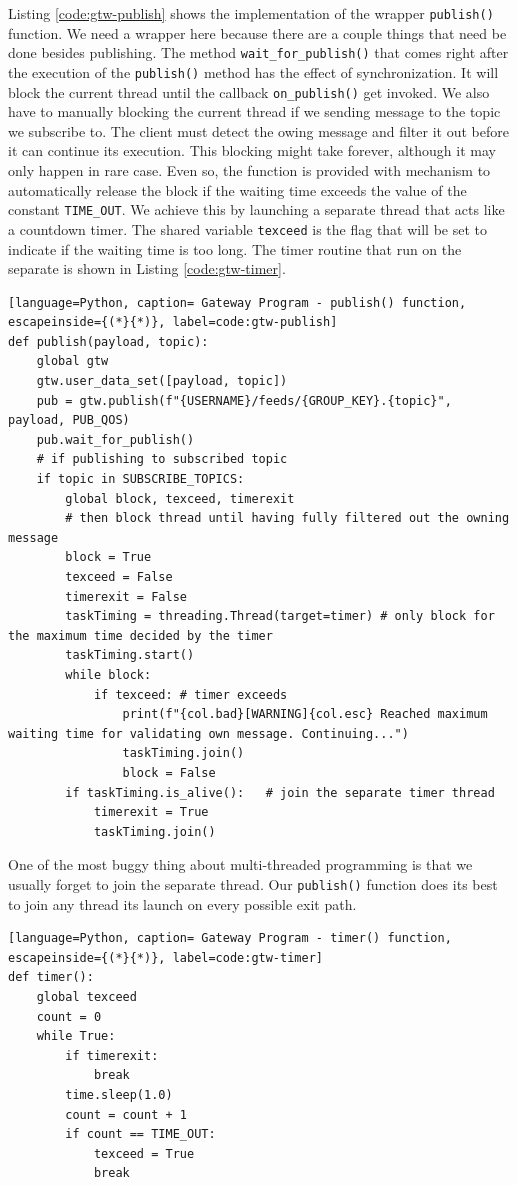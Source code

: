 Listing \ref{code:gtw-publish} shows the implementation of the wrapper \texttt{publish()} function. We need a wrapper here because there are a couple things that need be done besides publishing. The method \texttt{wait\_for\_publish()} that comes right after the execution of the \texttt{publish()} method has the effect of synchronization. It will block the current thread until the callback \texttt{on\_publish()} get invoked. We also have to manually blocking the current thread if we sending message to the topic we subscribe to. The client must detect the owing message and filter it out before it can continue its execution. This blocking might take forever, although it may only happen in rare case. Even so, the function is provided with mechanism to automatically release the block if the waiting time exceeds the value of the constant \texttt{TIME\_OUT}. We achieve this by launching a separate thread that acts like a countdown timer. The shared variable \texttt{texceed} is the flag that will be set to indicate if the waiting time is too long. The timer routine that run on the separate is shown in Listing \ref{code:gtw-timer}.
\begin{lstlisting}[language=Python, caption= Gateway Program - publish() function, escapeinside={(*}{*)}, label=code:gtw-publish]
def publish(payload, topic):
    global gtw
    gtw.user_data_set([payload, topic])
    pub = gtw.publish(f"{USERNAME}/feeds/{GROUP_KEY}.{topic}", payload, PUB_QOS)
    pub.wait_for_publish()
    # if publishing to subscribed topic
    if topic in SUBSCRIBE_TOPICS:
        global block, texceed, timerexit
        # then block thread until having fully filtered out the owning message
        block = True
        texceed = False
        timerexit = False
        taskTiming = threading.Thread(target=timer) # only block for the maximum time decided by the timer
        taskTiming.start()
        while block:
            if texceed: # timer exceeds
                print(f"{col.bad}[WARNING]{col.esc} Reached maximum waiting time for validating own message. Continuing...")
                taskTiming.join()
                block = False
        if taskTiming.is_alive():   # join the separate timer thread
            timerexit = True
            taskTiming.join()
\end{lstlisting}
One of the most buggy thing about multi-threaded programming is that we usually forget to join the separate thread. Our \texttt{publish()} function does its best to join any thread its launch on every possible exit path.
\begin{lstlisting}[language=Python, caption= Gateway Program - timer() function, escapeinside={(*}{*)}, label=code:gtw-timer]
def timer():
    global texceed
    count = 0
    while True:
        if timerexit:
            break
        time.sleep(1.0)
        count = count + 1
        if count == TIME_OUT:
            texceed = True
            break
\end{lstlisting}

